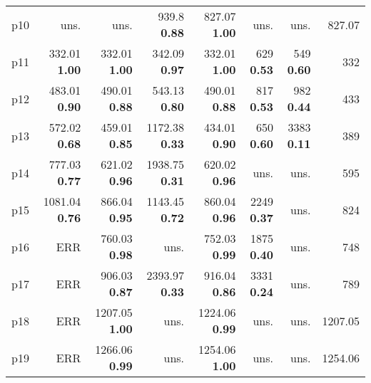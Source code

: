 \begin{tabular}{lrrrrrrr}
\multicolumn{1}{l|}{p10} & uns. & uns. & {\footnotesize 939.8} \textbf{0.88} & {\footnotesize 827.07} \textbf{1.00} & uns. & uns. & \multicolumn{1}{|r}{827.07}\\
\multicolumn{1}{l|}{p11} & {\footnotesize 332.01} \textbf{1.00} & {\footnotesize 332.01} \textbf{1.00} & {\footnotesize 342.09} \textbf{0.97} & {\footnotesize 332.01} \textbf{1.00} & {\footnotesize 629} \textbf{0.53} & {\footnotesize 549} \textbf{0.60} & \multicolumn{1}{|r}{332}\\
\multicolumn{1}{l|}{p12} & {\footnotesize 483.01} \textbf{0.90} & {\footnotesize 490.01} \textbf{0.88} & {\footnotesize 543.13} \textbf{0.80} & {\footnotesize 490.01} \textbf{0.88} & {\footnotesize 817} \textbf{0.53} & {\footnotesize 982} \textbf{0.44} & \multicolumn{1}{|r}{433}\\
\multicolumn{1}{l|}{p13} & {\footnotesize 572.02} \textbf{0.68} & {\footnotesize 459.01} \textbf{0.85} & {\footnotesize 1172.38} \textbf{0.33} & {\footnotesize 434.01} \textbf{0.90} & {\footnotesize 650} \textbf{0.60} & {\footnotesize 3383} \textbf{0.11} & \multicolumn{1}{|r}{389}\\
\multicolumn{1}{l|}{p14} & {\footnotesize 777.03} \textbf{0.77} & {\footnotesize 621.02} \textbf{0.96} & {\footnotesize 1938.75} \textbf{0.31} & {\footnotesize 620.02} \textbf{0.96} & uns. & uns. & \multicolumn{1}{|r}{595}\\
\multicolumn{1}{l|}{p15} & {\footnotesize 1081.04} \textbf{0.76} & {\footnotesize 866.04} \textbf{0.95} & {\footnotesize 1143.45} \textbf{0.72} & {\footnotesize 860.04} \textbf{0.96} & {\footnotesize 2249} \textbf{0.37} & uns. & \multicolumn{1}{|r}{824}\\
\multicolumn{1}{l|}{p16} & ERR & {\footnotesize 760.03} \textbf{0.98} & uns. & {\footnotesize 752.03} \textbf{0.99} & {\footnotesize 1875} \textbf{0.40} & uns. & \multicolumn{1}{|r}{748}\\
\multicolumn{1}{l|}{p17} & ERR & {\footnotesize 906.03} \textbf{0.87} & {\footnotesize 2393.97} \textbf{0.33} & {\footnotesize 916.04} \textbf{0.86} & {\footnotesize 3331} \textbf{0.24} & uns. & \multicolumn{1}{|r}{789}\\
\multicolumn{1}{l|}{p18} & ERR & {\footnotesize 1207.05} \textbf{1.00} & uns. & {\footnotesize 1224.06} \textbf{0.99} & uns. & uns. & \multicolumn{1}{|r}{1207.05}\\
\multicolumn{1}{l|}{p19} & ERR & {\footnotesize 1266.06} \textbf{0.99} & uns. & {\footnotesize 1254.06} \textbf{1.00} & uns. & uns. & \multicolumn{1}{|r}{1254.06}\\

\end{tabular}
